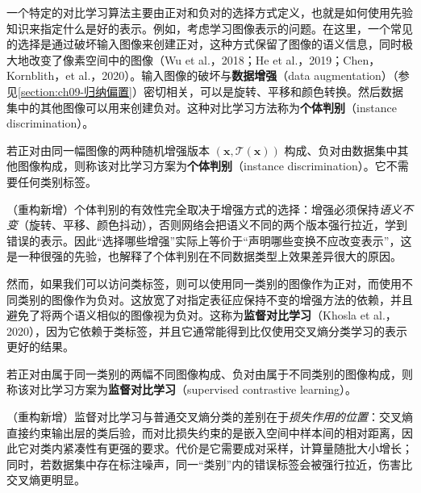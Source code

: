 \documentclass[../../main.tex]{subfiles}
\begin{document}
一个特定的对比学习算法主要由正对和负对的选择方式定义，也就是如何使用先验知识来指定什么是好的表示。例如，考虑学习图像表示的问题。在这里，一个常见的选择是通过破坏输入图像来创建正对，这种方式保留了图像的语义信息，同时极大地改变了像素空间中的图像（Wu et al.，2018；He et al.，2019；Chen，Kornblith，et al.，2020）。输入图像的破坏与\textbf{数据增强}（data augmentation）（参见\cref{section:ch09-归纳偏置}）密切相关，可以是旋转、平移和颜色转换。然后数据集中的其他图像可以用来创建负对。这种对比学习方法称为\textbf{个体判别}（instance discrimination）。

\begin{definition}[个体判别]\label{definition:ch06-个体判别}
若正对由同一幅图像的两种随机增强版本 $(\boldsymbol{x},\mathcal{T}(\boldsymbol{x}))$ 构成、负对由数据集中其他图像构成，则称该对比学习方案为\textbf{个体判别}（instance discrimination）。它不需要任何类别标签。
\end{definition}

\begin{remark}（重构新增）个体判别的有效性完全取决于增强方式的选择：增强必须保持\emph{语义不变}（旋转、平移、颜色抖动），否则网络会把语义不同的两个版本强行拉近，学到错误的表示。因此“选择哪些增强”实际上等价于“声明哪些变换不应改变表示”，这是一种很强的先验，也解释了个体判别在不同数据类型上效果差异很大的原因。
\end{remark}

然而，如果我们可以访问类标签，则可以使用同一类别的图像作为正对，而使用不同类别的图像作为负对。这放宽了对指定表征应保持不变的增强方法的依赖，并且避免了将两个语义相似的图像视为负对。这称为\textbf{监督对比学习}（Khosla et al.，2020），因为它依赖于类标签，并且它通常能得到比仅使用交叉熵分类学习的表示更好的结果。

\begin{definition}[监督对比学习]\label{definition:ch06-监督对比学习}
若正对由属于同一类别的两幅不同图像构成、负对由属于不同类别的图像构成，则称该对比学习方案为\textbf{监督对比学习}（supervised contrastive learning）。
\end{definition}

\begin{remark}（重构新增）监督对比学习与普通交叉熵分类的差别在于\emph{损失作用的位置}：交叉熵直接约束输出层的类后验，而对比损失约束的是嵌入空间中样本间的相对距离，因此它对类内紧凑性有更强的要求。代价是它需要成对采样，计算量随批大小增长；同时，若数据集中存在标注噪声，同一“类别”内的错误标签会被强行拉近，伤害比交叉熵更明显。
\end{remark}
\end{document}

